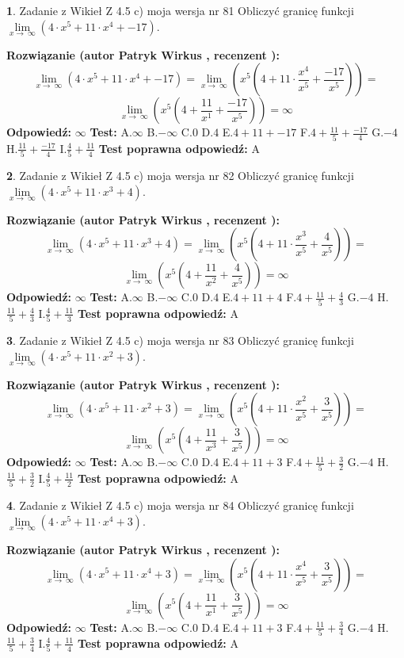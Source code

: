 \documentclass[12pt, a4paper]{article}
\theoremstyle{definition} %
\newtheorem{zad}{}
\newcommand{\zadStart}[1]{\begin{zad}#1\newline}
\newcommand{\zadStop}{\end{zad}}
\newcommand{\rozwStart}[2]{\noindent \textbf{Rozwiązanie (autor #1 , recenzent #2): }\newline}
\newcommand{\rozwStop}{\newline}
\newcommand{\odpStart}{\noindent \textbf{Odpowiedź:}\newline}
\newcommand{\odpStop}{\newline}
\newcommand{\testStart}{\noindent \textbf{Test:}\newline}
\newcommand{\testStop}{\newline}
\newcommand{\kluczStart}{\noindent \textbf{Test poprawna odpowiedź:}\newline}
\newcommand{\kluczStop}{\newline}
\begin{document}
\zadStart{Zadanie z Wikieł Z 4.5 c) moja wersja nr 81}
Obliczyć granicę funkcji  $\lim\limits_{x\to\ \infty}(4 \cdot x^{5}+11 \cdot x^{4}+-17)$.
\zadStop
\rozwStart{Patryk Wirkus}{}
$$\lim\limits_{x\to\ \infty}(4 \cdot x^{5}+11 \cdot x^{4}+-17) = \lim\limits_{x\to\ \infty}(x^{5}(4 +11 \cdot \frac{x^{4}}{x^{5}}+\frac{-17}{x^{5}})) =$$ $$\lim\limits_{x\to\ \infty}(x^{5}(4 +\frac{11}{x^{1}}+\frac{-17}{x^{5}})) =\infty$$
\rozwStop
\odpStart
$\infty$
\odpStop
\testStart
A.$\infty$ B.$-\infty$ C.$0$ D.$4$ E.$4 + 11 + -17$
F.$4+\frac{11}{5}+\frac{-17}{4}$ G.$-4$
H.$\frac{11}{5}+\frac{-17}{4}$
I.$\frac{4}{5}+\frac{11}{4}$
\testStop
\kluczStart
A
\kluczStop



\zadStart{Zadanie z Wikieł Z 4.5 c) moja wersja nr 82}
Obliczyć granicę funkcji  $\lim\limits_{x\to\ \infty}(4 \cdot x^{5}+11 \cdot x^{3}+4)$.
\zadStop
\rozwStart{Patryk Wirkus}{}
$$\lim\limits_{x\to\ \infty}(4 \cdot x^{5}+11 \cdot x^{3}+4) = \lim\limits_{x\to\ \infty}(x^{5}(4 +11 \cdot \frac{x^{3}}{x^{5}}+\frac{4}{x^{5}})) =$$ $$\lim\limits_{x\to\ \infty}(x^{5}(4 +\frac{11}{x^{2}}+\frac{4}{x^{5}})) =\infty$$
\rozwStop
\odpStart
$\infty$
\odpStop
\testStart
A.$\infty$ B.$-\infty$ C.$0$ D.$4$ E.$4 + 11 + 4$
F.$4+\frac{11}{5}+\frac{4}{3}$ G.$-4$
H.$\frac{11}{5}+\frac{4}{3}$
I.$\frac{4}{5}+\frac{11}{3}$
\testStop
\kluczStart
A
\kluczStop



\zadStart{Zadanie z Wikieł Z 4.5 c) moja wersja nr 83}
Obliczyć granicę funkcji  $\lim\limits_{x\to\ \infty}(4 \cdot x^{5}+11 \cdot x^{2}+3)$.
\zadStop
\rozwStart{Patryk Wirkus}{}
$$\lim\limits_{x\to\ \infty}(4 \cdot x^{5}+11 \cdot x^{2}+3) = \lim\limits_{x\to\ \infty}(x^{5}(4 +11 \cdot \frac{x^{2}}{x^{5}}+\frac{3}{x^{5}})) =$$ $$\lim\limits_{x\to\ \infty}(x^{5}(4 +\frac{11}{x^{3}}+\frac{3}{x^{5}})) =\infty$$
\rozwStop
\odpStart
$\infty$
\odpStop
\testStart
A.$\infty$ B.$-\infty$ C.$0$ D.$4$ E.$4 + 11 + 3$
F.$4+\frac{11}{5}+\frac{3}{2}$ G.$-4$
H.$\frac{11}{5}+\frac{3}{2}$
I.$\frac{4}{5}+\frac{11}{2}$
\testStop
\kluczStart
A
\kluczStop



\zadStart{Zadanie z Wikieł Z 4.5 c) moja wersja nr 84}
Obliczyć granicę funkcji  $\lim\limits_{x\to\ \infty}(4 \cdot x^{5}+11 \cdot x^{4}+3)$.
\zadStop
\rozwStart{Patryk Wirkus}{}
$$\lim\limits_{x\to\ \infty}(4 \cdot x^{5}+11 \cdot x^{4}+3) = \lim\limits_{x\to\ \infty}(x^{5}(4 +11 \cdot \frac{x^{4}}{x^{5}}+\frac{3}{x^{5}})) =$$ $$\lim\limits_{x\to\ \infty}(x^{5}(4 +\frac{11}{x^{1}}+\frac{3}{x^{5}})) =\infty$$
\rozwStop
\odpStart
$\infty$
\odpStop
\testStart
A.$\infty$ B.$-\infty$ C.$0$ D.$4$ E.$4 + 11 + 3$
F.$4+\frac{11}{5}+\frac{3}{4}$ G.$-4$
H.$\frac{11}{5}+\frac{3}{4}$
I.$\frac{4}{5}+\frac{11}{4}$
\testStop
\kluczStart
A
\kluczStop
\end{document}
